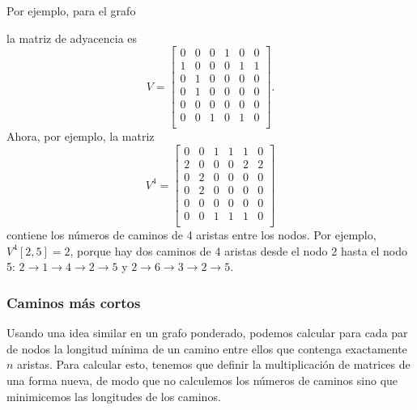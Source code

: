 Por ejemplo, para el grafo
\begin{center}
\end{center}
la matriz de adyacencia es
\[
V= \begin{bmatrix}
  0 & 0 & 0 & 1 & 0 & 0 \\
  1 & 0 & 0 & 0 & 1 & 1 \\
  0 & 1 & 0 & 0 & 0 & 0 \\
  0 & 1 & 0 & 0 & 0 & 0 \\
  0 & 0 & 0 & 0 & 0 & 0 \\
  0 & 0 & 1 & 0 & 1 & 0 \\
 \end{bmatrix}.
\]
Ahora, por ejemplo, la matriz
\[
V^4= \begin{bmatrix}
  0 & 0 & 1 & 1 & 1 & 0 \\
  2 & 0 & 0 & 0 & 2 & 2 \\
  0 & 2 & 0 & 0 & 0 & 0 \\
  0 & 2 & 0 & 0 & 0 & 0 \\
  0 & 0 & 0 & 0 & 0 & 0 \\
  0 & 0 & 1 & 1 & 1 & 0 \\
 \end{bmatrix}
\]
contiene los números de caminos de 4 aristas
entre los nodos.
Por ejemplo, $V^4[2,5]=2$,
porque hay dos caminos de 4 aristas
desde el nodo 2 hasta el nodo 5:
$2 \rightarrow 1 \rightarrow 4 \rightarrow 2 \rightarrow 5$
y
$2 \rightarrow 6 \rightarrow 3 \rightarrow 2 \rightarrow 5$.

\subsubsection{Caminos más cortos}

Usando una idea similar en un grafo ponderado,
podemos calcular para cada par de nodos la longitud mínima
de un camino
entre ellos que contenga exactamente $n$ aristas.
Para calcular esto, tenemos que definir la multiplicación de matrices
de una forma nueva, de modo que no calculemos los números
de caminos sino que minimicemos las longitudes de los caminos.

